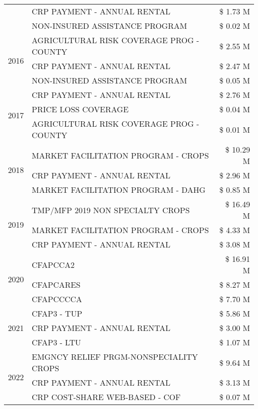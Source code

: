 \begin{tabular}{llr}
 & CRP PAYMENT - ANNUAL RENTAL & \$ 1.73 M \\
 & NON-INSURED ASSISTANCE PROGRAM & \$ 0.02 M \\
\cline{1-3}
\multirow[t]{3}{*}{2016} & AGRICULTURAL RISK COVERAGE PROG - COUNTY & \$ 2.55 M \\
 & CRP PAYMENT - ANNUAL RENTAL & \$ 2.47 M \\
 & NON-INSURED ASSISTANCE PROGRAM & \$ 0.05 M \\
\cline{1-3}
\multirow[t]{3}{*}{2017} & CRP PAYMENT - ANNUAL RENTAL & \$ 2.76 M \\
 & PRICE LOSS COVERAGE & \$ 0.04 M \\
 & AGRICULTURAL RISK COVERAGE PROG - COUNTY & \$ 0.01 M \\
\cline{1-3}
\multirow[t]{3}{*}{2018} & MARKET FACILITATION PROGRAM - CROPS & \$ 10.29 M \\
 & CRP PAYMENT - ANNUAL RENTAL & \$ 2.96 M \\
 & MARKET FACILITATION PROGRAM - DAHG & \$ 0.85 M \\
\cline{1-3}
\multirow[t]{3}{*}{2019} & TMP/MFP 2019 NON SPECIALTY CROPS & \$ 16.49 M \\
 & MARKET FACILITATION PROGRAM - CROPS & \$ 4.33 M \\
 & CRP PAYMENT - ANNUAL RENTAL & \$ 3.08 M \\
\cline{1-3}
\multirow[t]{3}{*}{2020} & CFAPCCA2 & \$ 16.91 M \\
 & CFAPCARES & \$ 8.27 M \\
 & CFAPCCCCA & \$ 7.70 M \\
\cline{1-3}
\multirow[t]{3}{*}{2021} & CFAP3 - TUP & \$ 5.86 M \\
 & CRP PAYMENT - ANNUAL RENTAL & \$ 3.00 M \\
 & CFAP3 - LTU & \$ 1.07 M \\
\cline{1-3}
\multirow[t]{3}{*}{2022} & EMGNCY RELIEF PRGM-NONSPECIALITY CROPS & \$ 9.64 M \\
 & CRP PAYMENT - ANNUAL RENTAL & \$ 3.13 M \\
 & CRP COST-SHARE WEB-BASED - COF & \$ 0.07 M \\
\cline{1-3}
\bottomrule
\end{tabular}
